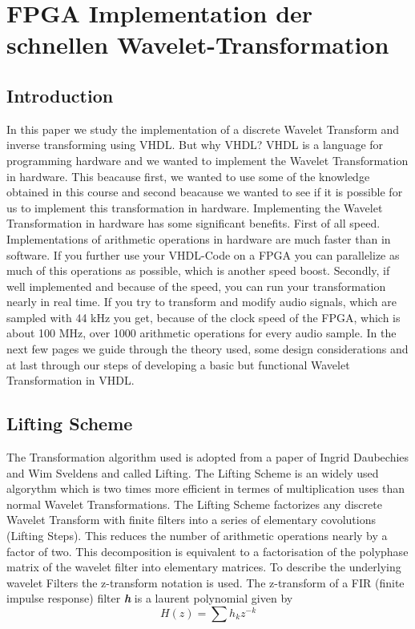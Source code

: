 %
%
%
\chapter{FPGA Implementation der schnellen Wavelet-Transformation\label{chapter:fpga}}
\begin{refsection}

\section{Introduction}
In this paper we study the implementation of a discrete Wavelet Transform and inverse transforming using VHDL.
But why VHDL? VHDL is a language for programming hardware and we wanted to implement the Wavelet Transformation in hardware.
This beacause first, we wanted to use some of the knowledge obtained in this course and second beacause we wanted to see if it is possible for us to implement this transformation in hardware.
Implementing the Wavelet Transformation in hardware has some significant benefits.
First of all speed. Implementations of arithmetic operations in hardware are much faster than in software.
If you further use your VHDL-Code on a FPGA you can parallelize as much of this operations as possible, which is another speed boost. 
Secondly, if well implemented and because of the speed, you can run your transformation nearly in real time.
If you try to transform and modify audio signals, which are sampled with 44 kHz you get, because of the clock speed of the FPGA, which is about 100 MHz, over 1000 arithmetic operations for every audio sample.
In the next few pages we guide through the theory used, some design considerations and at last through our steps of developing a basic but functional Wavelet Transformation in VHDL. 

\section{Lifting Scheme}

The Transformation algorithm used is adopted from a paper of Ingrid Daubechies and Wim Sveldens \cite{fpga:Daubechies1998} and called Lifting. 
The Lifting Scheme is an widely used algorythm which is two times more efficient in termes of multiplication uses than normal Wavelet Transformations.
The Lifting Scheme factorizes any discrete Wavelet Transform  with finite filters into a series of elementary covolutions (Lifting Steps).
This reduces the number of arithmetic operations nearly by a factor of two.
This decomposition is equivalent to a factorisation of the polyphase matrix of the wavelet filter into elementary matrices. 
To describe the underlying wavelet Filters the z-transform notation is used.
The z-transform of a FIR (finite impulse response) filter \textit{\textbf{h}} is a laurent polynomial given by
\begin{equation}\label{equ:impulse}
	H(z) = \sum h_k z^{-k}
\end{equation}


\end{refsection}
